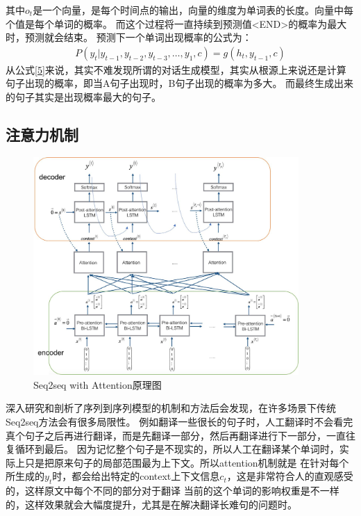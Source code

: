 \documentclass[supercite]{HustGraduPaper}
\theoremstyle{definition}
\begin{document}
其中$o_t$是一个向量，是每个时间点的输出，向量的维度为单词表的长度。向量中每个值是每个单词的概率。
而这个过程将一直持续到预测值<END>的概率为最大时，预测就会结束。
预测下一个单词出现概率的公式为：
\begin{align}
  P(y_{t}|y_{t-1},y_{t-2},y_{t-3},\dots,y_{1},c) = g(h_{t},y_{t-1},c) \label{5}
\end{align}
从公式\ref{5}来说，其实不难发现所谓的对话生成模型，其实从根源上来说还是计算句子出现的概率，即当A句子出现时，B句子出现的概率为多大。
而最终生成出来的句子其实是出现概率最大的句子。


\subsection{注意力机制}
\begin{figure}[H] %
  \centering %
  \includegraphics[width=0.9\textwidth]{images/attention.jpg} %
  \caption{Seq2seq with Attention原理图} %
  \label{Fig.attention} %
\end{figure}
深入研究和剖析了序列到序列模型的机制和方法后会发现，在许多场景下传统Seq2seq方法会有很多局限性。
例如翻译一些很长的句子时，人工翻译时不会看完真个句子之后再进行翻译，而是先翻译一部分，然后再翻译进行下一部分，一直往复循环到最后。
因为记忆整个句子是不现实的，所以人工在翻译某个单词时，实际上只是把原来句子的局部范围最为上下文。所以attention机制就是
在针对每个所生成的$y_{t}$时，都会给出特定的context上下文信息$c_{t}$，这是非常符合人的直观感受的，这样原文中每个不同的部分对于翻译
当前的这个单词的影响权重是不一样的，这样效果就会大幅度提升，尤其是在解决翻译长难句的问题时。
\end{document}
